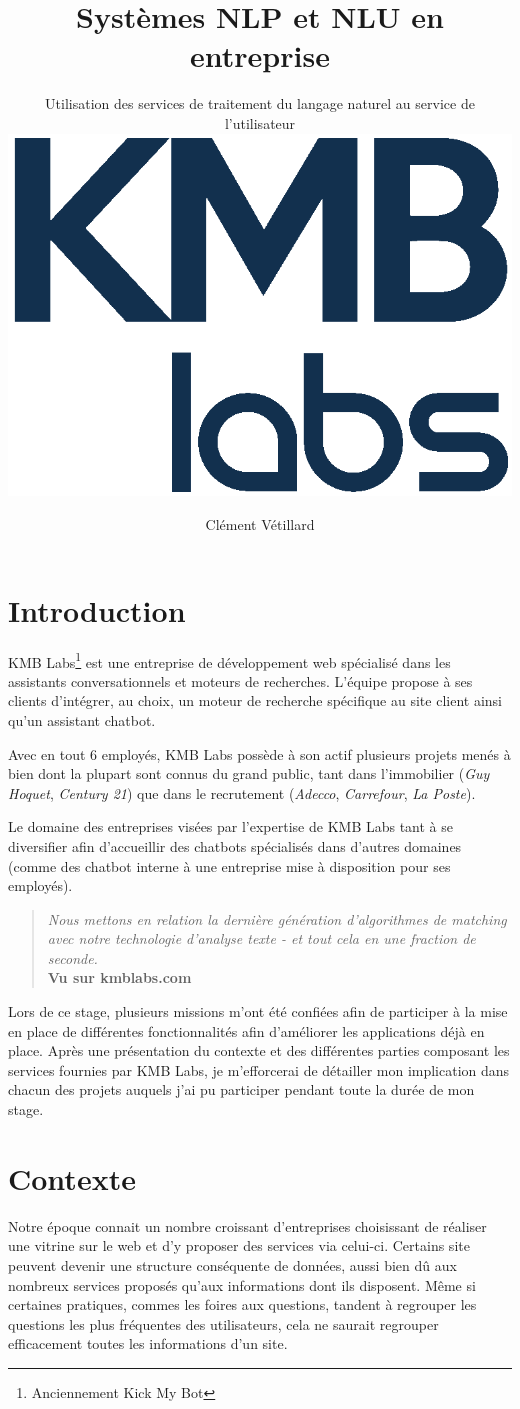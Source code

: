 \documentclass[12pt,a4paper,twoside]{scrreprt}
\title{Systèmes NLP et NLU en entreprise}
\subtitle{
	Utilisation des services de traitement du langage naturel au service de l'utilisateur\\
	\vspace{0.3cm}
	\includegraphics{pictures/kmb}
}
\author{Clément Vétillard}
\date{\vfill}
\begin{document}
\maketitle

\abstract{}

\tableofcontents
\thispagestyle{empty}

\chapter*{Introduction}
KMB Labs\footnote{Anciennement Kick My Bot} est une entreprise de développement web spécialisé dans les assistants conversationnels et moteurs de recherches. L'équipe propose à ses clients d'intégrer, au choix, un moteur de recherche spécifique au site client ainsi qu'un assistant chatbot.

Avec en tout 6 employés, KMB Labs possède à son actif plusieurs projets menés à bien dont la plupart sont connus du grand public, tant dans l'immobilier (\textit{Guy Hoquet}, \textit{Century 21}) que dans le recrutement (\textit{Adecco}, \textit{Carrefour}, \textit{La Poste}).

Le domaine des entreprises visées par l'expertise de KMB Labs tant à se diversifier afin d'accueillir des chatbots spécialisés dans d'autres domaines (comme des chatbot interne à une entreprise mise à disposition pour ses employés).

\begin{quote}
	\og \textit{Nous mettons en relation la dernière génération d'algorithmes de matching avec notre technologie d'analyse texte - et tout cela en une fraction de seconde.}\fg{}\\
	\textbf{Vu sur kmblabs.com}
\end{quote}

Lors de ce stage, plusieurs missions m'ont été confiées afin de participer à la mise en place de différentes fonctionnalités afin d'améliorer les applications déjà en place. Après une présentation du contexte et des différentes parties composant les services fournies par KMB Labs, je m'efforcerai de détailler mon implication dans chacun des projets auquels j'ai pu participer pendant toute la durée de mon stage.

\chapter{Contexte}
Notre époque connait un nombre croissant d'entreprises choisissant de réaliser une vitrine sur le web et d'y proposer des services via celui-ci. Certains site peuvent devenir une structure conséquente de données, aussi bien dû aux nombreux services proposés qu'aux informations dont ils disposent. Même si certaines pratiques, commes les foires aux questions, tandent à regrouper les questions les plus fréquentes des utilisateurs, cela ne saurait regrouper efficacement toutes les informations d'un site.
\end{document}

